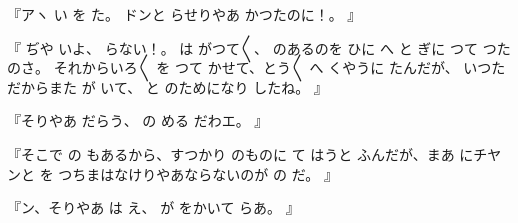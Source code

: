 『アヽ
い
を
た。
ドンと
らせりやあ
かつたのに！。
』

『
ぢや
いよ、
らない！。
は
がつて〳〵{}、
のあるのを
ひに
へ
と
ぎに
つて
つたのさ。
それからいろ〳〵
を
つて
かせて、とう〳〵
へ
くやうに
たんだが、
いつた
だからまた
が
いて、
と
のためになり
したね。
』

『そりやあ
だらう、
の
める
だわエ。
』

『そこで
の
もあるから、すつかり
のものに
て
はうと
ふんだが、まあ
にチヤンと
を
つちまはなけりやあならないのが
の
だ。
』

『ン、そりやあ
は
え、
が
をかいて
らあ。
』

